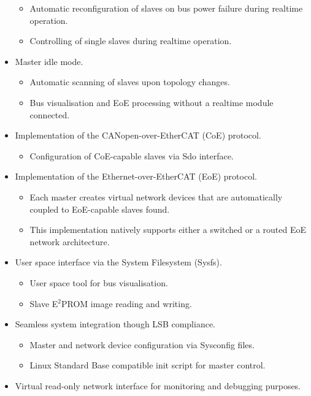 \documentclass[a4paper,12pt,BCOR6mm,bibtotoc,idxtotoc]{scrbook}
\begin{document}
\begin{itemize}
\begin{itemize}
  \item Automatic reconfiguration of slaves on bus power failure
    during realtime operation.
  \item Controlling of single slaves during realtime operation.
  \end{itemize}
\item Master idle mode.
  \begin{itemize}
  \item Automatic scanning of slaves upon topology changes.
  \item Bus visualisation and EoE processing without a realtime module
    connected.
  \end{itemize}
\item Implementation of the CANopen-over-EtherCAT (CoE) protocol.
  \begin{itemize}
  \item Configuration of CoE-capable slaves via Sdo interface.
  \end{itemize}
\item Implementation of the Ethernet-over-EtherCAT (EoE) protocol.
  \begin{itemize}
  \item Each master creates virtual network devices that are
    automatically coupled to EoE-cap\-able slaves found.
  \item This implementation natively supports either a switched or a
    routed EoE network architecture.
  \end{itemize}
\item User space interface via the System Filesystem
  (Sysfs).
  \begin{itemize}
  \item User space tool for bus visualisation.
  \item Slave E$^2$PROM image reading and writing.
  \end{itemize}
\item Seamless system integration though LSB compliance.
  \begin{itemize}
  \item Master and network device configuration via Sysconfig files.
  \item Linux Standard Base compatible init script for master control.
  \end{itemize}
\item Virtual read-only network interface for monitoring and debugging
  purposes.
\end{itemize}
\end{document}
